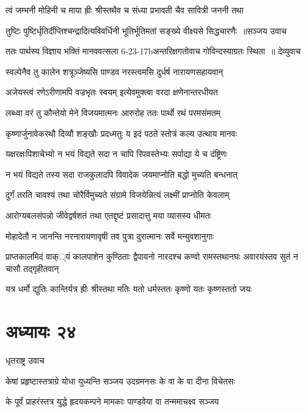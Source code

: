 \twolineshloka
{त्वं जम्भनी मोहिनी च माया ह्रीः श्रीस्तथैव च}
{संध्या प्रभावती चैव सावित्री जननी तथा}


\threelineshloka
{तुष्टिः पुष्टिर्धृतिर्दीप्तिश्चन्द्रादित्यविवर्धिनी}
{भूतिर्भूतिमतां सङ्ख्ये वीक्ष्यसे सिद्धचारणैः ॥सञ्जय उवाच}
{}


\threelineshloka
{ततः पार्थस्य विज्ञाय भक्तिं मानववत्सला}
{6-23-17bअन्तरिक्षगतोवाच गोविन्दस्याग्रतः स्थिता ॥ देव्युवाच}
{}


\twolineshloka
{स्वल्पेनैव तु कालेन शत्रूञ्जेष्यसि पाण्डव}
{नरस्त्वमसि दुर्धर्ष नारायणसहायवान्}


\twolineshloka
{अजेयस्त्वं रणेऽरीणामपि वज्रभृतः स्वयम्}
{इत्येवमुक्त्वा वरदा क्षणेनान्तरधीयत}


\twolineshloka
{लब्ध्वा वरं तु कौन्तेयो मेने विजयमात्मनः}
{आरुरोह ततः पार्थो रथं परमसंमतम्}


\twolineshloka
{कृष्णार्जुनावेकरथौ दिव्यौ शङ्खौः प्रदध्मतुः}
{य इदं पठते स्तोत्रं कल्य उत्थाय मानवः}


\twolineshloka
{यक्षरक्षःपिशाचेभ्यो न भयं विद्यते सदा}
{न चापि रिपवस्तेभ्यः सर्पाद्या ये च दंष्ट्रिणः}


\twolineshloka
{न भयं विद्यते तस्य सदा राजकुलादपि}
{विवादेक जयमाप्नोति बद्धो मुच्यति बन्धनात्}


\twolineshloka
{दुर्गं तरति चावश्यं तथा चोरैर्विमुच्यते}
{संग्रामे विजयेन्नित्यं लक्ष्मीं प्राप्नोति केवलाम्}


\twolineshloka
{आरोग्यबलसंपन्नो जीवेद्वर्षशतं तथा}
{एतद्दृष्टं प्रसादात्तु मया व्यासस्य धीमतः}


\twolineshloka
{मोहादेतौ न जानन्ति नरनारायणावृषी}
{तव पुत्रा दुरात्मानः सर्वे मन्युवशानुगाः}


\threelineshloka
{प्राप्तकालमिदं वाक््यं कालपाशेन कुण्ठिताः}
{द्वैपायनो नारदश्च कण्वो रामस्तथानघः}
{अवारयंस्तव सुतं न चासौ तद्गृहीतवान्}


\twolineshloka
{यत्र धर्मो द्युतिः कान्तिर्यत्र ह्रीः श्रीस्तथा मतिः}
{यतो धर्मस्ततः कृष्णो यतः कृष्णस्ततो जयः}


\chapter{अध्यायः २४}
\twolineshloka
{धृतराष्ट्र उवाच}
{}


\twolineshloka
{केषां प्रहृष्टास्तत्राग्रे योधा युध्यन्ति सञ्जय}
{उदग्रमनसः के वा के वा दीना विचेतसः}


\twolineshloka
{के पूर्वं प्राहरंस्तत्र युद्धे हृदयकम्पने}
{मामकाः पाण्डवेया वा तन्ममाचक्ष्व सञ्जय}


